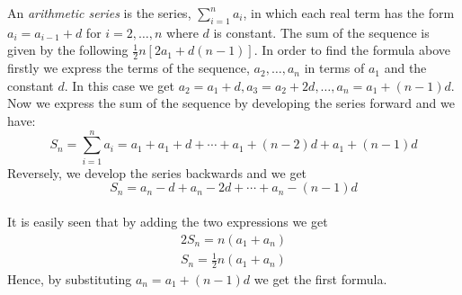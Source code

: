 \documentclass[12pt]{article}
\begin{document}
An \emph{arithmetic series} is the series, $\sum_{i=1}^na_i$, in which each real term has the form $ a_i=a_{i-1}+d $ for $i=2,\ldots, n $ where $ d$ is constant. The sum of the sequence is given by the following
$\displaystyle \frac{1}{2}n[2a_1+d(n-1)].$
In order to find the formula above firstly we express the terms of the sequence, $ a_2, \ldots, a_n$ in terms of $ a_1$ and the constant $ d$. In this case we get $ a_2=a_1+d, a_3=a_2+2d,\ldots , a_n=a_1+(n-1)d$. Now we express the sum of the sequence by developing the series forward and we have:
$$S_n=\sum_{i=1}^na_i =a_1+a_1+d+\cdots +a_1+(n-2)d+a_1+(n-1)d$$
Reversely, we develop the series backwards and we get
$$S_n=a_n-d+a_n-2d+\cdots +a_n-(n-1)d$$
\\It is easily seen that by adding the two expressions we get
\begin{eqnarray}
2S_n=n(a_1+a_n)\\
S_n= \frac{1}{2}n(a_1+a_n)
\end{eqnarray}
Hence, by substituting $a_n=a_1+(n-1)d$ we get the first formula. 
\end{document}

